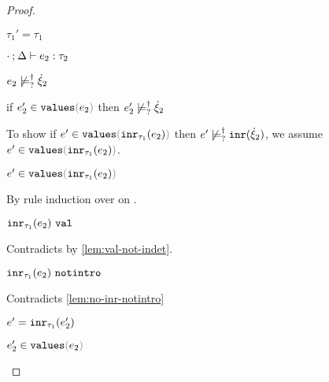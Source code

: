 \begin{proof}
\begin{byCases}
\begin{byCases}
\begin{byCases}
          \begin{pfsteps*}
          \item $\tau_1'=\tau_1$ 
          \item $\cdot \mathbin{;} \Delta \vdash e_2 : \tau_2$  
          \item $e_2 \not\models_{?}^{\dag} \dot{\xi}_2$  
          \item if $\inValues{e_2'}{e_2}$ then $e_2' \not\models_{?}^{\dag} \dot{\xi}_2$  
          \end{pfsteps*} 
          To show if $\inValues{e'}{\hinr{\tau_1}{e_2}}$ then $e' \not\models_{?}^{\dag} \mathtt{inr}(\dot{\xi}_2)$, we assume $\inValues{e'}{\hinr{\tau_1}{e_2}}$.
          \begin{pfsteps*}
          \item $\inValues{e'}{\hinr{\tau_1}{e_2}}$  
          \end{pfsteps*}
          By rule induction over  on .
          \begin{byCases}
            \item[\text{(\ref{rule:IVVal})}]
            \begin{pfsteps*}
            \item $\mathtt{inr}_{\tau_1}({e_2}) ~\mathtt{val}$ 
            \end{pfsteps*} 
            Contradicts  by \autoref{lem:val-not-indet}.
            \item[\text{(\ref{rule:IVIndet})}] 
            \begin{pfsteps*}
            \item $\mathtt{inr}_{\tau_1}({e_2}) ~\mathtt{notintro}$ 
            \end{pfsteps*} 
            Contradicts \autoref{lem:no-inr-notintro}
            \item[\text{(\ref{rule:IVInr})}] 
            \begin{pfsteps*}
            \item $e'=\mathtt{inr}_{\tau_1}({e_2'})$ 
            \item $\inValues{e_2'}{e_2}$  

\end{pfsteps*}
\end{byCases}
\end{byCases}
\end{byCases}
\end{byCases}
\end{proof}
